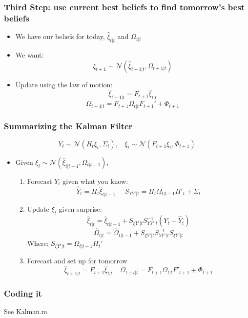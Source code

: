 \documentclass{beamer}
\begin{document}
\begin{frame}
\frametitle[alignment=center]{Third Step: use current best beliefs to find tomorrow's best beliefs}
\begin{itemize}
\item We have our beliefs for today, $\hat{\xi}_{t|t}$ and $\Omega_{t|t}$ 
\bigskip
\item We want:
$$\xi_{t+1}\sim\mathcal{N}(\hat{\xi}_{t+1|t},\Omega_{t+1|t})$$
\item Update using the law of motion:
$$\hat{\xi}_{t+1|t}=F_{t+1}\hat{\xi}_{t|t}$$
$$\Omega_{t+1|t}=F_{t+1}\Omega_{t|t}F_{t+1}'+\Phi_{t+1}$$
\end{itemize}
\end{frame}

\begin{frame}
\frametitle[alignment=center]{Summarizing the Kalman Filter}
$$Y_t\sim\mathcal{N}\left(H_t\xi_t,\Sigma_t\right),\ \ \ \ \xi_{t}\sim\mathcal{N}\left(F_{t+1}\xi_t,\Phi_{t+1}\right)$$
\begin{itemize}
\item Given $\xi_t\sim\mathcal{N}(\hat{\xi}_{t|t-1},\Omega_{t|t-1})$,
\begin{enumerate}
\item Forecast $Y_t$ given what you know:
$$\hat{Y}_t=H_t\hat{\xi}_{t|t-1}\ \ \ \ \ \ S_{YY'|t}=H_t\Omega_{t|t-1}H'_t+\Sigma_t$$
\item Update $\xi_t$ given surprise:
$$\hat{\xi}_{t|t}=\hat{\xi}_{t|t-1}+S_{\xi Y'|t}S_{YY'|t}^{-1}(Y_t-\hat{Y}_t)$$
$$\hat{\Omega}_{t|t}=\hat{\Omega}_{t|t-1}+S_{\xi Y'|t}S_{YY'|t}^{-1}S_{\xi Y'|t}$$
Where: $S_{\xi Y'|t}=\Omega_{t|t-1}H_t'$
\item Forecast and set up for tomorrow
$$\hat{\xi}_{t+1|t}=F_{t+1}\hat{\xi}_{t|t}\ \ \ \ \ \Omega_{t+t|t}=F_{t+1}\Omega_{t|t}F'_{t+1}+\Phi_{t+1}$$
\end{enumerate}
\end{itemize}
\end{frame}

\begin{frame}
\frametitle[alignment=center]{Coding it}
See Kalman.m
\end{frame}
\end{document}
